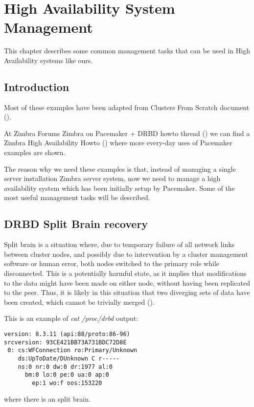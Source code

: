 

\chapter{High Availability System Management}
\label{chap:ha-system-management}
This chapter describes some common management tasks that can be used in High Availability systems like ours.

\section {Introduction}
Most of these examples have been adapted from Clusters From Scratch document (\cite{ClustersFromScratch}).

At Zimbra Forums Zimbra on Pacemaker + DRBD howto thread (\cite{ZForumsTaer}) we can find a Zimbra High Availability Howto (\cite{TaerHowtoHAZimbra8}) where more every-day uses of Pacemaker examples are shown.

The reason why we need these examples is that, instead of managing a single server installation Zimbra server system, now we need to manage a high availability system which has been initially setup by Pacemaker. Some of the most useful management tasks will be described.

\section {DRBD Split Brain recovery}

Split brain is a situation where, due to temporary failure of all network links between cluster nodes, and possibly due to intervention by a cluster management software or human error, both nodes switched to the primary role while disconnected. This is a potentially harmful state, as it implies that modifications to the data might have been made on either node, without having been replicated to the peer. Thus, it is likely in this situation that two diverging sets of data have been created, which cannot be trivially merged (\cite{DrbdSplitBrain}).

This is an example of \textit{cat /proc/drbd} output:
\begin{verbatim}
version: 8.3.11 (api:88/proto:86-96)
srcversion: 93CE421BB73A731BDC72D8E 
 0: cs:WFConnection ro:Primary/Unknown
    ds:UpToDate/DUnknown C r-----
    ns:0 nr:0 dw:0 dr:1977 al:0
      bm:0 lo:0 pe:0 ua:0 ap:0
        ep:1 wo:f oos:153220
\end{verbatim}
where there is an split brain.


